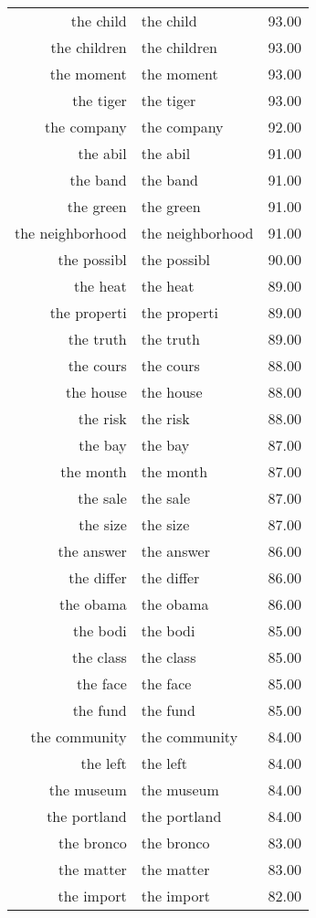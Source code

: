 \begin{table}[ht]
\begin{tabular}{rlr}
  the child & the child & 93.00 \\ 
  the children & the children & 93.00 \\ 
  the moment & the moment & 93.00 \\ 
  the tiger & the tiger & 93.00 \\ 
  the company & the company & 92.00 \\ 
  the abil & the abil & 91.00 \\ 
  the band & the band & 91.00 \\ 
  the green & the green & 91.00 \\ 
  the neighborhood & the neighborhood & 91.00 \\ 
  the possibl & the possibl & 90.00 \\ 
  the heat & the heat & 89.00 \\ 
  the properti & the properti & 89.00 \\ 
  the truth & the truth & 89.00 \\ 
  the cours & the cours & 88.00 \\ 
  the house & the house & 88.00 \\ 
  the risk & the risk & 88.00 \\ 
  the bay & the bay & 87.00 \\ 
  the month & the month & 87.00 \\ 
  the sale & the sale & 87.00 \\ 
  the size & the size & 87.00 \\ 
  the answer & the answer & 86.00 \\ 
  the differ & the differ & 86.00 \\ 
  the obama & the obama & 86.00 \\ 
  the bodi & the bodi & 85.00 \\ 
  the class & the class & 85.00 \\ 
  the face & the face & 85.00 \\ 
  the fund & the fund & 85.00 \\ 
  the community & the community & 84.00 \\ 
  the left & the left & 84.00 \\ 
  the museum & the museum & 84.00 \\ 
  the portland & the portland & 84.00 \\ 
  the bronco & the bronco & 83.00 \\ 
  the matter & the matter & 83.00 \\ 
  the import & the import & 82.00 \\ 

\end{tabular}
\end{table}
